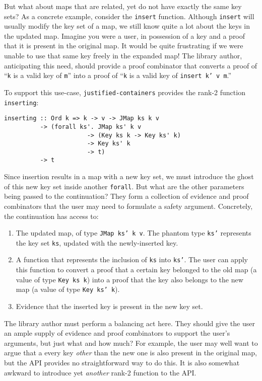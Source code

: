 \documentclass[format=sigplan, review=false, screen=true, 10pt]{acmart}
\makeatletter
\let\origsubsection\subsection
\renewcommand\subsection{\@ifstar{\starsubsection}{\nostarsubsection}}
\newcommand\nostarsubsection[1]
{\subsectionprelude\origsubsection{#1}\subsectionpostlude}
\newcommand\starsubsection[1]
{\subsectionprelude\origsubsection*{#1}\subsectionpostlude}
\newcommand\subsectionprelude{%
  \vspace{-0.25em}
}
\newcommand\subsectionpostlude{%
  \vspace{-0.05em}
}
\makeatother
\begin{document}
\subsection{Changing the key set}\label{changing-keys}
But what about maps that are related, yet do not have exactly the same key sets?
As a concrete example, consider the \texttt{insert} function. Although \texttt{insert} will usually
modify the key set of a map, we still know quite a lot about the keys in the updated map.
 Imagine you were a user, in possession of a key and a proof
that it is present in the original map. It would be quite frustrating if  we were
unable to use that same key freely in the expanded map!
The library author, anticipating this need, should provide a proof combinator that
converts a proof of ``\texttt{k} is a valid key of \texttt{m}'' into a proof of
``\texttt{k} is a valid key of \texttt{insert k' v m}.''

To support this use-case, \texttt{justified-containers} provides the rank-2
function \texttt{inserting}:
\begin{verbatim}
inserting :: Ord k => k -> v -> JMap ks k v
          -> (forall ks'. JMap ks' k v
                       -> (Key ks k -> Key ks' k)
                       -> Key ks' k
                       -> t)
          -> t
\end{verbatim}
Since insertion results in a map with a new key set, we must
introduce the ghost of this new key set inside another \texttt{forall}.
But what are the other parameters being passed to the continuation?
They form a collection of evidence and proof combinators that the user may
need to formulate a safety argument. Concretely,  the continuation has access to:
\begin{enumerate}
\item The updated map, of type \texttt{JMap ks' k v}. The phantom type \texttt{ks'}
  represents the key set \texttt{ks}, updated with the newly-inserted key.
\item A function that represents the inclusion of \texttt{ks} into \texttt{ks'}.
  The user can apply this function to convert a proof that a certain key belonged to the
  old map (a value of type \texttt{Key ks k}) into a proof that the key also belongs to the new map (a value of type \texttt{Key ks' k}).
\item Evidence that the inserted key is present in the new key set.
\end{enumerate}

The library author must perform a balancing act here. They should give 
the user an ample supply of evidence and proof combinators to support the user's
arguments, but just what and how much? For example, the user may well want to argue that a
every key \emph{other} than the new one is also present in the original map,
 but the API provides no straightforward way to do this.
It is also somewhat awkward to introduce yet \emph{another}
rank-2 function to the API.
\end{document}
